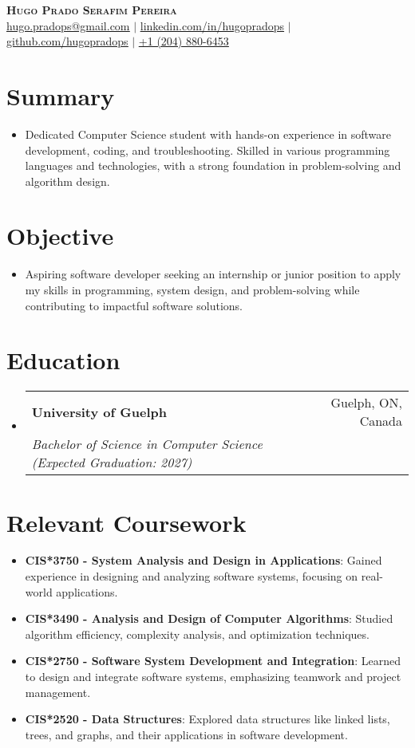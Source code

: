 \documentclass[letterpaper,11pt]{article}
\makeatletter
\newcommand{\resumeItem}[2]{
  \item\small{
    \textbf{#1}{: #2 \vspace{-2pt}}
  }
}
\newcommand{\resumeSubheading}[4]{
  \vspace{-1pt}\item
    \begin{tabular*}{0.97\textwidth}[t]{l@{\extracolsep{\fill}}r}
      \textbf{#1} & #2 \\
      \textit{\small#3} & \textit{\small#4} \\
    \end{tabular*}\vspace{-5pt}
}
\newcommand{\resumeSubItem}[2]{\resumeItem{#1}{#2}\vspace{-4pt}}
\newcommand{\resumeSubHeadingListStart}{\begin{itemize}[leftmargin=*]}
\newcommand{\resumeSubHeadingListEnd}{\end{itemize}}
\makeatother
\begin{document}
\begin{center}
  \textbf{\color{myblue} \Huge \scshape Hugo Prado Serafim Pereira} \\ \vspace{1pt}
  \small \href{mailto:hugo.pradops@gmail.com}{\underline{hugo.pradops@gmail.com}} $|$ 
  \href{https://www.linkedin.com/in/hugopradops/}{\underline{linkedin.com/in/hugopradops}} $|$
  \href{https://github.com/hugopradops}{\underline{github.com/hugopradops}} $|$
  \href{tel:+12048806453}{\underline{+1 (204) 880-6453}}
\end{center}

\section{Summary}
  \resumeSubHeadingListStart
    \item Dedicated Computer Science student with hands-on experience in software development, coding, and troubleshooting. Skilled in various programming languages and technologies, with a strong foundation in problem-solving and algorithm design.
  \resumeSubHeadingListEnd

\section{Objective}
  \resumeSubHeadingListStart
    \item Aspiring software developer seeking an internship or junior position to apply my skills in programming, system design, and problem-solving while contributing to impactful software solutions.
  \resumeSubHeadingListEnd

\section{Education}
  \resumeSubHeadingListStart
    \resumeSubheading
      {University of Guelph}{Guelph, ON, Canada}
      {Bachelor of Science in Computer Science (Expected Graduation: 2027)}{}
  \resumeSubHeadingListEnd

\section{Relevant Coursework}
  \resumeSubHeadingListStart
    \resumeSubItem{CIS*3750 - System Analysis and Design in Applications}{Gained experience in designing and analyzing software systems, focusing on real-world applications.}
    \resumeSubItem{CIS*3490 - Analysis and Design of Computer Algorithms}{Studied algorithm efficiency, complexity analysis, and optimization techniques.}
    \resumeSubItem{CIS*2750 - Software System Development and Integration}{Learned to design and integrate software systems, emphasizing teamwork and project management.}
    \resumeSubItem{CIS*2520 - Data Structures}{Explored data structures like linked lists, trees, and graphs, and their applications in software development.}
  \resumeSubHeadingListEnd
\end{document}
